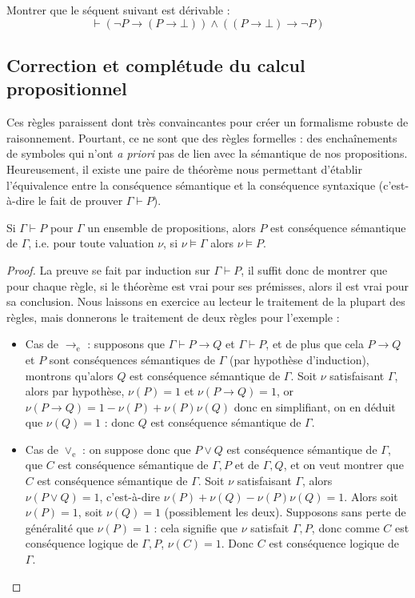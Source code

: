 \begin{exo}
    Montrer que le séquent suivant est dérivable : $$\vdash (\lnot P \to (P\to\bot))\land((P\to\bot)\to\lnot P)$$
\end{exo}

\subsection{Correction et complétude du calcul propositionnel}

Ces règles paraissent dont très convaincantes pour créer un formalisme robuste de raisonnement. Pourtant, ce ne sont que des règles formelles : des enchaînements de symboles qui n'ont \textit{a priori} pas de lien avec la sémantique de nos propositions. Heureusement, il existe une paire de théorème nous permettant d'établir l'équivalence entre la conséquence sémantique et la conséquence syntaxique (c'est-à-dire le fait de prouver $\Gamma\vdash P$).

\begin{them}
    Si $\Gamma\vdash P$ pour $\Gamma$ un ensemble de propositions, alors $P$ est conséquence sémantique de $\Gamma$, i.e. pour toute valuation $\nu$, si $\nu\models\Gamma$ alors $\nu\models P$.
\end{them}

\begin{proof}
    La preuve se fait par induction sur $\Gamma\vdash P$, il suffit donc de montrer que pour chaque règle, si le théorème est vrai pour ses prémisses, alors il est vrai pour sa conclusion. Nous laissons en exercice au lecteur le traitement de la plupart des règles, mais donnerons le traitement de deux règles pour l'exemple :
    \begin{itemize}[label=$\bullet$]
        \item Cas de $\to_\mathrm e$ : supposons que $\Gamma\vdash P\to Q$ et $\Gamma\vdash P$, et de plus que cela $P\to Q$ et $P$ sont conséquences sémantiques de $\Gamma$ (par hypothèse d'induction), montrons qu'alors $Q$ est conséquence sémantique de $\Gamma$. Soit $\nu$ satisfaisant $\Gamma$, alors par hypothèse, $\nu(P) = 1$ et $\nu(P\to Q)=1$, or $\nu(P\to Q) = 1 - \nu(P)+\nu(P)\nu(Q)$ donc en simplifiant, on en déduit que $\nu(Q) = 1$ : donc $Q$ est conséquence sémantique de $\Gamma$.
        \item Cas de $\lor_\mathrm e$ : on suppose donc que $P\lor Q$ est conséquence sémantique de $\Gamma$, que $C$ est conséquence sémantique de $\Gamma,P$ et de $\Gamma,Q$, et on veut montrer que $C$ est conséquence sémantique de $\Gamma$. Soit $\nu$ satisfaisant $\Gamma$, alors $\nu(P\lor Q) = 1$, c'est-à-dire $\nu(P)+\nu(Q)-\nu(P)\nu(Q)=1$. Alors soit $\nu(P)=1$, soit $\nu(Q)=1$ (possiblement les deux). Supposons sans perte de généralité que $\nu(P)=1$ : cela signifie que $\nu$ satisfait $\Gamma,P$, donc comme $C$ est conséquence logique de $\Gamma,P$, $\nu(C)=1$. Donc $C$ est conséquence logique de $\Gamma$. 
    \end{itemize}
\end{proof}

